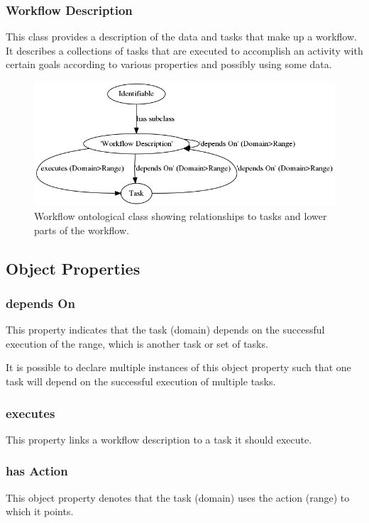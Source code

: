 \subsubsection{Workflow Description}

This class provides a description of the data and tasks that make up a workflow.
It describes a collections of tasks that are executed to accomplish an activity
with certain goals according to various properties and possibly using some data.

\begin{figure}[htbp] \centering
\includegraphics[width=\textwidth]{figures/workflowDescription.png}
\caption{Workflow ontological class showing relationships to tasks and lower
parts of the workflow.}
\label{workflow-description}
\end{figure}


\subsection{Object Properties}
\subsubsection{ depends On } This property indicates that the task (domain)
depends on the successful execution of the range, which is another task or set
of tasks.

It is possible to declare multiple instances of this object property such that
one task will depend on the successful execution of multiple tasks.
\subsubsection{ executes } This property links a workflow description to a task
it should execute.
\subsubsection{ has Action } This object property denotes that the task (domain)
uses the action (range) to which it points.
